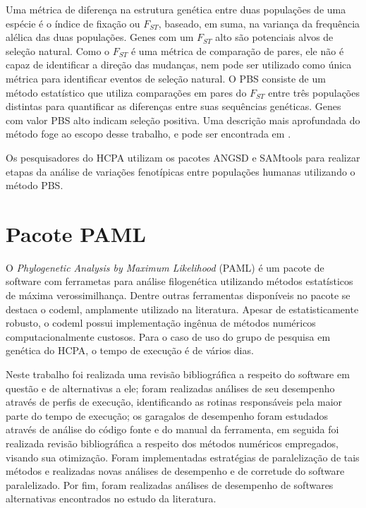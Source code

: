\documentclass[cic,tc]{iiufrgs}
\begin{document}
Uma métrica de diferença na estrutura genética entre duas populações de uma
espécie é o índice de fixação ou $F_{ST}$, baseado, em suma, na variança da
frequência alélica das duas populações. Genes com um $F_{ST}$ alto são
potenciais alvos de seleção natural.\cite{yi2010sequencing} Como o $F_{ST}$ é
uma métrica de comparação de pares, ele não é capaz de identificar a direção
das mudanças, nem pode ser utilizado como única métrica para identificar
eventos de seleção natural. O PBS consiste de um método estatístico que
utiliza comparações em pares do $F_{ST}$ entre três populações distintas para
quantificar as diferenças entre suas sequências genéticas. Genes com valor
PBS alto indicam seleção positiva.\cite{jiang2019population} Uma descrição
mais aprofundada do método foge ao escopo desse trabalho, e pode ser
encontrada em \cite{yi2010sequencing}.

Os pesquisadores do HCPA utilizam os pacotes ANGSD e SAMtools para realizar
etapas da análise de variações fenotípicas entre populações humanas
utilizando o método PBS.

\chapter{Pacote PAML}

O \textit{Phylogenetic Analysis by Maximum Likelihood} (PAML) é um pacote de
software com ferrametas para análise filogenética utilizando métodos
estatísticos de máxima verossimilhança.\cite{yang2007paml} Dentre
outras ferramentas disponíveis no pacote se destaca o codeml,
amplamente utilizado na literatura.\cite{maldonado2016lmap} Apesar de
estatisticamente robusto,\cite{maldonado2016lmap} o codeml possui
implementação ingênua de métodos numéricos computacionalmente
custosos.\cite{yang2020paml} Para o caso de uso do grupo de pesquisa em
genética do HCPA, o tempo de execução é de vários dias.

Neste trabalho foi realizada uma revisão bibliográfica a respeito do software
em questão e de alternativas a ele; foram realizadas análises de seu desempenho
através de perfis de execução, identificando as rotinas responsáveis pela maior
parte do tempo de execução; os garagalos de desempenho foram estudados através
de análise do código fonte e do manual da ferramenta, em seguida foi realizada
revisão bibliográfica a respeito dos métodos numéricos empregados, visando sua
otimização. Foram implementadas estratégias de paralelização de tais métodos e
realizadas novas análises de desempenho e de corretude do software
paralelizado. Por fim, foram realizadas análises de desempenho de softwares
alternativas encontrados no estudo da literatura.
\end{document}
